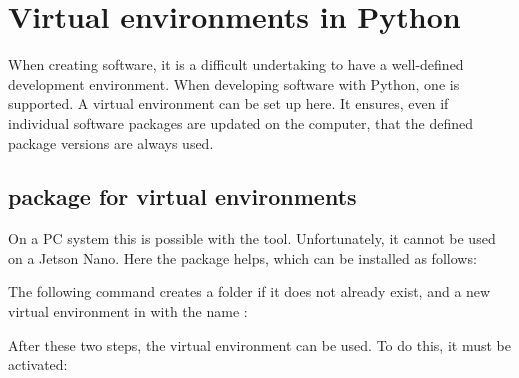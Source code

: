 %
%





\chapter{Virtual environments in Python}


When creating software, it is a difficult undertaking to have a well-defined development environment. When developing software with Python, one is supported. A virtual environment can be set up here. It ensures, even if individual software packages are updated on the computer, that the defined package versions are always used. 





\section{package  for virtual environments}

On a PC system this is possible with the  tool. Unfortunately, it cannot be used on a Jetson Nano. Here the package  helps, which can be installed as follows:

\medskip


\medskip

The following command creates a folder  if it does not already exist, and a new virtual environment in  with the name :

\medskip


\medskip

After these two steps, the virtual environment can be used. To do this, it must be activated:
\medskip


\medskip

